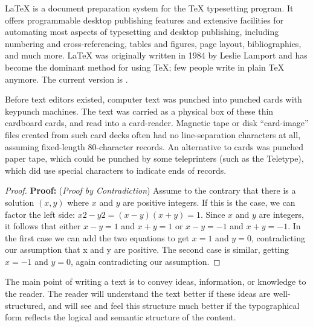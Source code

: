 \documentclass[11pt, letterpaper]{homework}
\date{\today}
\begin{document}
\maketitle

\begin{problem}[Problem 1:]
\LaTeX{} is a document preparation system for the \TeX{}
  typesetting program. It offers programmable desktop
  publishing features and extensive facilities for
  automating most aspects of typesetting and desktop
  publishing, including numbering and cross-referencing,
  tables and figures, page layout, bibliographies, and
  much more. \LaTeX{} was originally written in 1984 by
  Leslie Lamport and has become the dominant method for
  using \TeX; few people write in plain \TeX{} anymore.
  The current version is \LaTeXe.
\end{problem}

\begin{solution}[]
 Before text editors existed, computer text was punched into punched cards with keypunch machines. The text was carried as a physical box of these thin cardboard cards, and read into a card-reader. Magnetic tape or disk ``card-image'' files created from such card decks often had no line-separation characters at all, assuming fixed-length 80-character records. An alternative to cards was punched paper tape, which could be punched by some teleprinters (such as the Teletype), which did use special characters to indicate ends of records.

\begin{proof}
{\bf Proof:} ({\it Proof by Contradiction}) Assume to the contrary that there is a solution $(x, y)$ where $x$ and $y$ are positive integers. If this is the case, we can factor the left side: $x2 - y2 = (x-y)(x+y) = 1$. Since $x$ and $y$ are integers, it follows that either $x-y = 1$ and $x+y = 1$ or $x-y = -1$ and $x+y = -1$. In the first case we can add the two equations to get $x = 1$ and $y = 0$, contradicting our assumption that x and y are positive. The second case is similar, getting $x = -1$ and $y = 0$, again contradicting our assumption. 
\end{proof}

\end{solution}

\begin{problem}[Problem 2:]
The main point of writing a text is to convey ideas, information, or knowledge to the reader. The reader will understand the text better if these ideas are well-structured, and will see and feel this structure much better if the typographical form reflects the logical and semantic structure of the content.
\end{problem}
\end{document}
